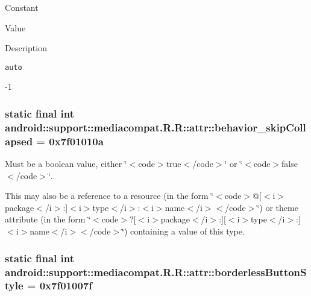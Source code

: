 Constant

Value

Description 

{\tt auto}

-1\hypertarget{classandroid_1_1support_1_1mediacompat_1_1_r_1_1attr_ac893aeca79d8aeb07786014d7216b71}{
\subsubsection[{behavior\_\-skipCollapsed}]{\setlength{\rightskip}{0pt plus 5cm}static final int android::support::mediacompat.R.R::attr::behavior\_\-skipCollapsed = 0x7f01010a}}
\label{classandroid_1_1support_1_1mediacompat_1_1_r_1_1attr_ac893aeca79d8aeb07786014d7216b71}


Must be a boolean value, either \char`\"{}$<$code$>$true$<$/code$>$\char`\"{} or \char`\"{}$<$code$>$false$<$/code$>$\char`\"{}. 

This may also be a reference to a resource (in the form \char`\"{}$<$code$>$@\mbox{[}$<$i$>$package$<$/i$>$:\mbox{]}$<$i$>$type$<$/i$>$:$<$i$>$name$<$/i$>$$<$/code$>$\char`\"{}) or theme attribute (in the form \char`\"{}$<$code$>$?\mbox{[}$<$i$>$package$<$/i$>$:\mbox{]}\mbox{[}$<$i$>$type$<$/i$>$:\mbox{]}$<$i$>$name$<$/i$>$$<$/code$>$\char`\"{}) containing a value of this type. \hypertarget{classandroid_1_1support_1_1mediacompat_1_1_r_1_1attr_14bac7e3987b6c64e4ea984662c0d8b6}{
\subsubsection[{borderlessButtonStyle}]{\setlength{\rightskip}{0pt plus 5cm}static final int android::support::mediacompat.R.R::attr::borderlessButtonStyle = 0x7f01007f}}
\label{classandroid_1_1support_1_1mediacompat_1_1_r_1_1attr_14bac7e3987b6c64e4ea984662c0d8b6}


